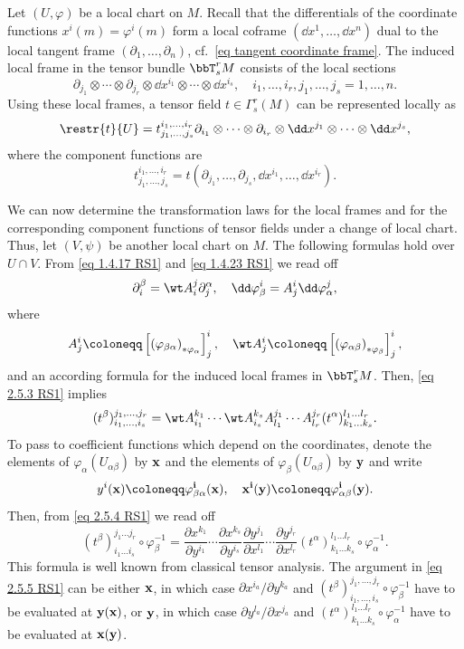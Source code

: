 Let $(U,\varphi)$ be a local chart on $M$. Recall that the differentials of the coordinate functions $x^i(m)=\varphi^i(m)$ form a local coframe $(\dd x^1,\ldots,\dd x^n)$ dual to the local tangent frame $(\partial_1,\ldots,\partial_n)$, cf.\ \eqref{eq tangent coordinate frame}. The induced local frame in the tensor bundle $\bbT^r_s M$ consists of the local sections 
\[\partial_{j_1}\otimes\cdots\otimes \partial_{j_r}\otimes \dd x^{i_1}\otimes\cdots\otimes \dd x^{i_s},\quad i_1,\ldots,i_r,j_1,\ldots,j_s=1,\ldots,n.\]
Using these local frames, a tensor field $t\in\Gamma^r_s(M)$ can be represented locally as 
\[\restr{t}{U}=t^{i_1,\ldots,i_r}_{j_1,\ldots,j_s}\partial_{i_1}\otimes\cdots\otimes\partial_{i_r}\otimes\dd x^{j_1}\otimes\cdots\otimes\dd x^{j_s},\]
where the component functions are 
\[t^{i_1,\ldots,i_r}_{j_1,\ldots,j_s}=t\left(\partial_{j_1},\ldots,\partial_{j_s},\dd x^{i_1},\ldots,\dd x^{i_r}\right).\label{eq 2.5.3 RS1}\]

We can now determine the transformation laws for the local frames and for the corresponding component functions of tensor fields under a change of local chart. Thus, let $(V,\psi)$ be another local chart on $M$. The following formulas hold over $U\cap V$. From \eqref{eq 1.4.17 RS1} and \eqref{eq 1.4.23 RS1} we read off 
\[\partial_i^\beta=\wt A^j_i \partial^\alpha_j,\quad \dd\varphi_\beta^i=A^i_j\dd\varphi_\alpha^j,\]
where 
\[A^i_j\coloneqq \left[\left(\varphi_{\beta\alpha}\right)_{\ast \varphi_\alpha}\right]^i_j,\quad \wt A^i_j\coloneqq \left[\left(\varphi_{\alpha\beta}\right)_{\ast \varphi_\beta}\right]^i_j,\]
and an according formula for the induced local frames in $\bbT^r_s M$. Then, \eqref{eq 2.5.3 RS1} implies 
\[(t^\beta)^{j_1,\ldots,j_r}_{i_1,\ldots,i_s}=\wt A^{k_1}_{i_1}\cdots \wt A^{k_s}_{i_s}A^{j_1}_{l_1}\cdots A^{j_r}_{l_r}(t^\alpha)^{l_1\ldots l_r}_{k_1\ldots k_s}.\label{eq 2.5.4 RS1}\]
To pass to coefficient functions which depend on the coordinates, denote the elements of $\varphi_\alpha(U_{\alpha\beta})$ by $\bf x$ and the elements of $\varphi_\beta(U_{\alpha\beta})$ by $\bf y$ and write 
\[y^i(\bf x)\coloneqq \varphi_{\beta\alpha}^i(\bf x),\quad x^i(\bf y)\coloneqq \varphi^i_{\alpha\beta}(\bf y).\]
Then, from \eqref{eq 2.5.4 RS1} we read off 
\[(t^\beta)^{j_1\ldots j_r}_{i_1\ldots i_s}\circ\varphi_\beta^{-1}=\frac{\partial x^{k_1}}{\partial y^{i_1}}\cdots \frac{\partial x^{k_s}}{\partial y^{i_s}}\frac{\partial y^{j_1}}{\partial x^{l_1}}\cdots \frac{\partial y^{j_r}}{\partial x^{l_r}}(t^\alpha)^{l_1\ldots l_r}_{k_1\ldots k_s}\circ\varphi_\alpha^{-1}.\label{eq 2.5.5 RS1}\]
This formula is well known from classical tensor analysis. The argument in \eqref{eq 2.5.5 RS1} can be either $\bf x$, in which case $\partial x^{i_a}/\partial y^{k_a}$ and $(t^\beta)^{j_1,\ldots,j_r}_{i_1,\ldots,i_s}\circ\varphi_\beta^{-1}$ have to be evaluated at $\bf y(\bf x)$, or $\bf y$, in which case $\partial y^{l_a}/\partial x^{j_a}$ and $(t^\alpha)^{l_1\ldots l_r}_{k_1\ldots k_s}\circ\varphi_\alpha^{-1}$ have to be evaluated at $\bf x(\bf y)$.

